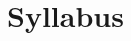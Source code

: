 \documentclass[../course]{subfiles}
\begin{document}
\section{Syllabus} \label{syl:ch06LaplaceTransform}
\end{document}
